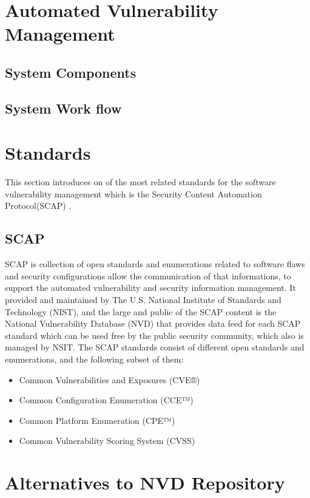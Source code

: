 \documentclass{llncs}
\begin{document}
\section{Automated Vulnerability Management}

\subsection{System Components}
\subsection{System Work flow}

\newpage
\section{Standards}
This section introduces on of the most related standards for the software vulnerability management which is the Security Content Automation Protocol(SCAP) \cite{scap}.


\subsection{SCAP}
 SCAP is collection of open standards and enumerations related to software flaws and security configurations allow the communication of that informations, to support the automated vulnerability and security information management.    
 It provided and maintained by The U.S. National Institute of Standards and Technology (NIST)\cite{nsit}, and the large and public of the SCAP content is the National Vulnerability Database (NVD)\cite{nvd} that provides data feed for each SCAP standard which can be used free by the public security community, which also is managed by NSIT.
 The SCAP standards consist of different open standards and enumerations, and the following subset of them:
 
 
 \begin{itemize}
 \item Common Vulnerabilities and Exposures (CVE®)
 \item  Common Configuration Enumeration (CCE™)
 \item Common Platform Enumeration (CPE™)
 \item Common Vulnerability Scoring System (CVSS)
 \end{itemize}
   


\newpage

\section{Alternatives to NVD Repository}
\end{document}
